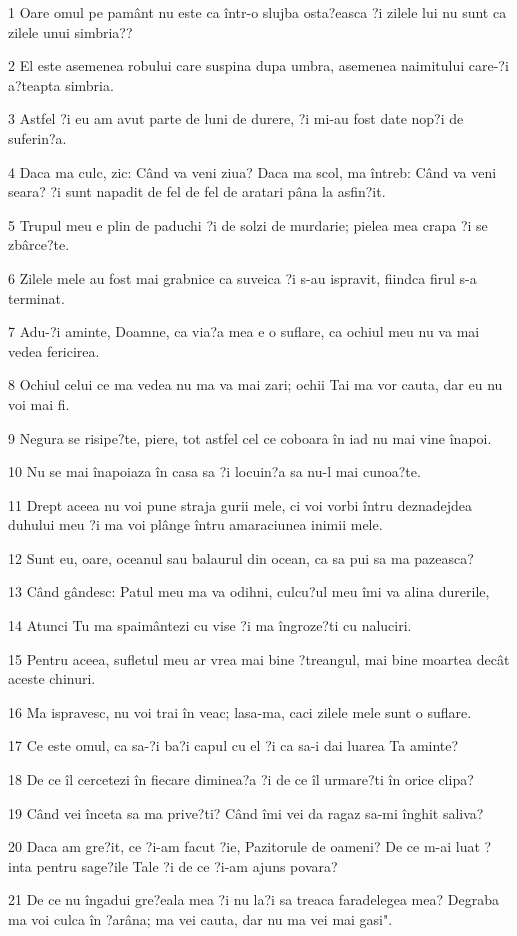 \par 1 Oare omul pe pamânt nu este ca într-o slujba osta?easca ?i zilele lui nu sunt ca zilele unui simbria??
\par 2 El este asemenea robului care suspina dupa umbra, asemenea naimitului care-?i a?teapta simbria.
\par 3 Astfel ?i eu am avut parte de luni de durere, ?i mi-au fost date nop?i de suferin?a.
\par 4 Daca ma culc, zic: Când va veni ziua? Daca ma scol, ma întreb: Când va veni seara? ?i sunt napadit de fel de fel de aratari pâna la asfin?it.
\par 5 Trupul meu e plin de paduchi ?i de solzi de murdarie; pielea mea crapa ?i se zbârce?te.
\par 6 Zilele mele au fost mai grabnice ca suveica ?i s-au ispravit, fiindca firul s-a terminat.
\par 7 Adu-?i aminte, Doamne, ca via?a mea e o suflare, ca ochiul meu nu va mai vedea fericirea.
\par 8 Ochiul celui ce ma vedea nu ma va mai zari; ochii Tai ma vor cauta, dar eu nu voi mai fi.
\par 9 Negura se risipe?te, piere, tot astfel cel ce coboara în iad nu mai vine înapoi.
\par 10 Nu se mai înapoiaza în casa sa ?i locuin?a sa nu-l mai cunoa?te.
\par 11 Drept aceea nu voi pune straja gurii mele, ci voi vorbi întru deznadejdea duhului meu ?i ma voi plânge întru amaraciunea inimii mele.
\par 12 Sunt eu, oare, oceanul sau balaurul din ocean, ca sa pui sa ma pazeasca?
\par 13 Când gândesc: Patul meu ma va odihni, culcu?ul meu îmi va alina durerile,
\par 14 Atunci Tu ma spaimântezi cu vise ?i ma îngroze?ti cu naluciri.
\par 15 Pentru aceea, sufletul meu ar vrea mai bine ?treangul, mai bine moartea decât aceste chinuri.
\par 16 Ma ispravesc, nu voi trai în veac; lasa-ma, caci zilele mele sunt o suflare.
\par 17 Ce este omul, ca sa-?i ba?i capul cu el ?i ca sa-i dai luarea Ta aminte?
\par 18 De ce îl cercetezi în fiecare diminea?a ?i de ce îl urmare?ti în orice clipa?
\par 19 Când vei înceta sa ma prive?ti? Când îmi vei da ragaz sa-mi înghit saliva?
\par 20 Daca am gre?it, ce ?i-am facut ?ie, Pazitorule de oameni? De ce m-ai luat ?inta pentru sage?ile Tale ?i de ce ?i-am ajuns povara?
\par 21 De ce nu îngadui gre?eala mea ?i nu la?i sa treaca faradelegea mea? Degraba ma voi culca în ?arâna; ma vei cauta, dar nu ma vei mai gasi".


